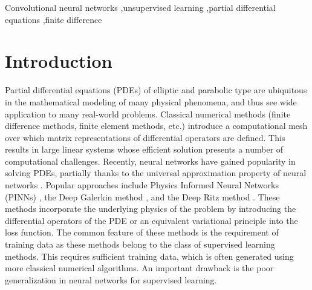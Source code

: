 \documentclass[preprint,12pt]{elsarticle}
\begin{document}
\begin{frontmatter}
\begin{keyword}
Convolutional neural networks \sep unsupervised learning \sep partial differential equations \sep finite difference
\end{keyword}

\end{frontmatter}


\section{Introduction}
\label{sec:intro}



Partial differential equations (PDEs) of elliptic and parabolic type are ubiquitous in the mathematical modeling of many physical phenomena, and thus see wide application to many real-world problems. 
Classical numerical methods (finite difference methods, finite element methods, etc.) introduce a computational mesh over which matrix representations of differential operators are defined. This results in large linear systems whose efficient solution presents a number of computational challenges. Recently, neural networks have gained popularity in solving PDEs, partially thanks to the universal approximation property of neural networks \cite{Hornik,Funahashi}. 
Popular approaches  include Physics Informed Neural Networks (PINNs) \cite{RaissiPINNs:2019}, the Deep Galerkin method \cite{SirignanoDGM:2018}, and the Deep Ritz method \cite{WangDRM:2018,MullerZeinhofer}. These methods incorporate the underlying physics of the problem by introducing the differential operators of the PDE or an equivalent variational principle into the loss function. The common feature of these methods is the requirement of training data as these methods belong to the class of supervised learning methods. This requires sufficient training data, which is often generated using more classical numerical algorithms. An important drawback is the poor generalization in neural networks for supervised learning.
\end{document}
